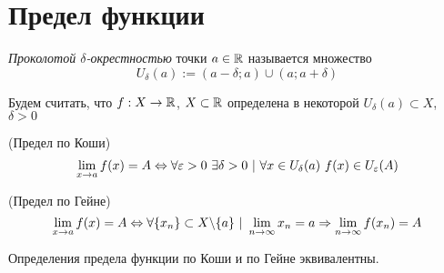 \section{Предел функции}

\begin{definition}
	\textit{Проколотой $\delta$-окрестностью} точки $a \in \mathbb{R}$ называется множество
	$$
		U_{\delta}(a) := (a - \delta; a) \cup (a; a + \delta)
	$$
\end{definition}

\begin{note}
	Будем считать, что $f : X \rightarrow \mathbb{R}$, $X \subset \mathbb{R}$ определена в некоторой $U_{\delta}(a) \subset X$, $\delta > 0$
\end{note}

\begin{definition} (Предел по Коши)
	$$
		\lim\limits_{x \rightarrow a} f(x) = A \Leftrightarrow \forall \varepsilon > 0\ \exists \delta > 0\ |\ \forall x \in U_{\delta}(a)\ f(x) \in U_{\varepsilon}(A)
	$$
\end{definition}

\begin{definition} (Предел по Гейне)
	$$
		\lim\limits_{x \rightarrow a} f(x) = A \Leftrightarrow \forall \{x_n\} \subset X \backslash \{a\}\ |\  \lim\limits_{n \rightarrow \infty} x_n = a \Rightarrow \lim\limits_{n \rightarrow \infty} f(x_n) = A
	$$
\end{definition}

\begin{theorem}
	Определения предела функции по Коши и по Гейне эквивалентны.
\end{theorem}

